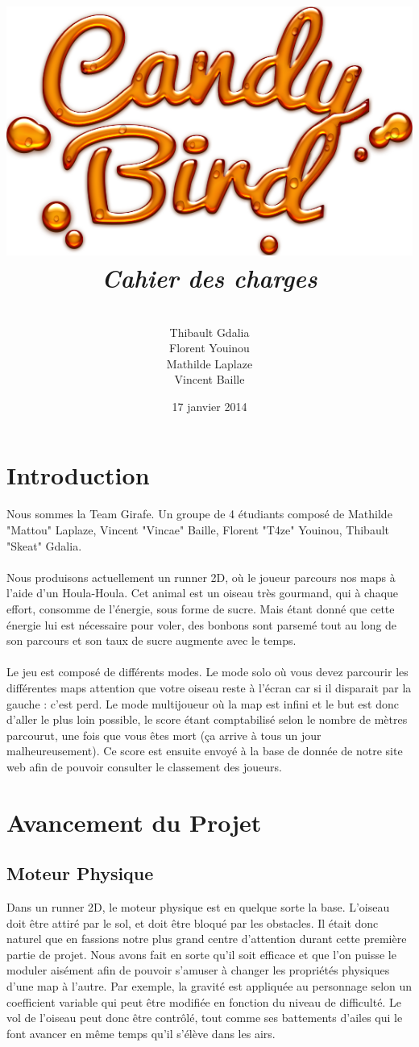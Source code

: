 \documentclass [11pt]{report}
\title{
	\includegraphics[scale=0.43]{images/Logojeu.png}
	 \\\vspace{20mm}
	\textbf{\Huge \itshape Cahier des charges }
	}
\author{ \\\vspace{2mm}
	Thibault Gdalia\\\vspace{2mm}
	Florent Youinou\\\vspace{2mm}
	Mathilde Laplaze\\\vspace{2mm}
	Vincent Baille \\\vspace{30mm}
	}
\date{17 janvier 2014}
\begin{document}
\thispagestyle{fancy}
\renewcommand{\baselinestretch}{0.001}
\maketitle
\tableofcontents

\newpage



\chapter*{Introduction}

\indent Nous sommes la Team Girafe. Un groupe de 4 étudiants composé de Mathilde "Mattou" Laplaze, Vincent "Vincae" Baille, Florent "T4ze" Youinou, Thibault "Skeat" Gdalia. \\\\
\indent Nous produisons actuellement un runner 2D, où le joueur parcours nos maps à l'aide d'un Houla-Houla. Cet animal est un oiseau très gourmand, qui à chaque effort, consomme de l'énergie, sous forme de sucre. Mais étant donné que cette énergie lui est nécessaire pour voler, des bonbons sont parsemé tout au long de son parcours et son taux de sucre augmente avec le temps.\\\\
\indent Le jeu est composé de différents modes. Le mode solo où vous devez parcourir les différentes maps attention que votre oiseau reste à l'écran car si il disparait par la gauche : c'est perd. Le mode multijoueur où la map est infini et le but est donc d'aller le plus loin possible, le score étant comptabilisé selon le nombre de mètres parcourut, une fois que vous êtes mort (ça arrive à tous un jour malheureusement). Ce score est ensuite envoyé à la base de donnée de notre site web afin de pouvoir consulter le classement des joueurs.



\chapter{Avancement du Projet}
	\section{Moteur Physique}
		Dans un runner 2D, le moteur physique est en quelque sorte la base. L'oiseau doit être attiré par le sol, et doit être bloqué par les obstacles. Il était donc naturel que en fassions notre plus grand centre d'attention durant cette première partie de projet. Nous avons fait en sorte qu'il soit efficace et que l'on puisse le moduler aisément afin de pouvoir s'amuser à changer les propriétés physiques d'une map à l'autre. Par exemple, la gravité est appliquée au personnage selon un coefficient variable qui peut être modifiée en fonction du niveau de difficulté. Le vol  de l'oiseau peut donc être contrôlé, tout comme ses battements d'ailes qui le font avancer en même temps qu'il s'élève dans les airs. \\\\
		
\end{document}
